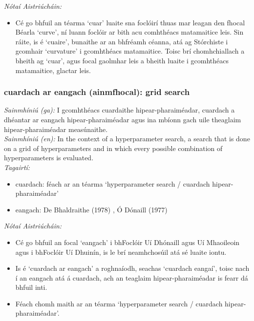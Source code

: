  \noindent \textit{Nótaí Aistriúcháin:}
\begin{itemize}
	\item Cé go bhfuil an téarma `cuar' luaite sna foclóirí thuas mar leagan den fhocal Béarla `curve', ní luann foclóir ar bith acu comhthéacs matamaitice leis. Sin ráite, is é `cuaire', bunaithe ar an bhfréamh céanna, atá ag Stórchiste i gcomhair `curvature' i gcomhthéacs matamaitice. Toisc brí chomhchiallach a bheith ag `cuar', agus focal gaolmhar leis a bheith luaite i gcomhthéacs matamaitice, glactar leis.
\end{itemize}


\subsubsection*{cuardach ar eangach (ainmfhocal): grid search}
 \noindent \textit{Sainmhíniú (ga):} I gcomhthéacs cuardaithe hipear-pharaiméadar, cuardach a dhéantar ar eangach hipear-pharaiméadar agus ina mbíonn gach uile theaglaim hipear-pharaiméadar measúnaithe.
\\
 \noindent \textit{Sainmhíniú (en):} In the context of a hyperparameter search, a search that is done on a grid of hyperparameters and in which every possible combination of hyperparameters is evaluated.
\\
 \noindent \textit{Tagairtí:}
\begin{itemize}
	\item cuardach: féach ar an téarma `hyperparameter search / cuardach hipear-pharaiméadar'
	\item eangach: De Bhaldraithe (1978) \cite{de-bhaldraithe}, Ó Dónaill (1977) \cite{odonaill}
\end{itemize}

 \noindent \textit{Nótaí Aistriúcháin:}
\begin{itemize}
	\item Cé go bhfuil an focal `eangach' i bhFoclóir Uí Dhónaill agus Uí Mhaoileoin agus i bhFoclóir Uí Dhuinín, is le brí neamhchosúil atá sé luaite iontu.
	\item Is é `cuardach ar eangach' a roghnaíodh, seachas `cuardach eangaí', toisc nach í an eangach atá á cuardach, ach an teaglaim hipear-pharaiméadar is fearr dá bhfuil inti.
	\item Féach chomh maith ar an téarma `hyperparameter search / cuardach hipear-pharaiméadar'.
\end{itemize}


